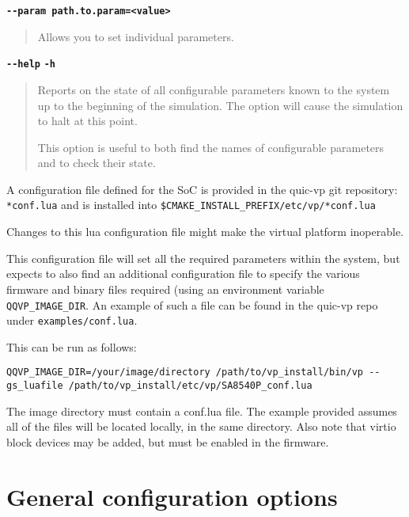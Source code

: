 {\textbf {\footnotesize{\lstinline!--param path.to.param=<value>!}}}
\vspace{-2pt}
\begin{quote}
Allows you to set individual parameters.
\end{quote}

{\textbf {\footnotesize{\lstinline!--help!}}} \newline
{\textbf {\footnotesize{\lstinline!-h!}}}
\vspace{-2pt}
\begin{quote}
Reports on the state of all configurable parameters known to the system up to the beginning of the simulation. The option will cause the simulation to halt at this point.

This option is useful to both find the names of configurable parameters and to check their state.
\end{quote}



A configuration file defined for the SoC is provided in the quic-vp git
repository: {\small{\lstinline!*conf.lua!}} and is installed into
{\small{\lstinline!$CMAKE_INSTALL_PREFIX/etc/vp/*conf.lua!}}

\caution Changes to this lua configuration file might make the virtual platform inoperable.

This configuration file will set all the required parameters within the system,
but expects to also find an additional configuration file to specify the
various firmware and binary files required (using an environment variable
{\small{\lstinline!QQVP_IMAGE_DIR!}}.  An example of such a file can be found
in the quic-vp repo under {\small{\lstinline!examples/conf.lua!}}.

This can be run as follows:

{\small{\lstinline!QQVP_IMAGE_DIR=/your/image/directory /path/to/vp_install/bin/vp --gs_luafile /path/to/vp_install/etc/vp/SA8540P_conf.lua!}}

The image directory must contain a conf.lua file. The example provided assumes
all of the files will be located locally, in the same directory. Also note that
virtio block devices may be added, but must be enabled in the firmware.
\section{General configuration options}

